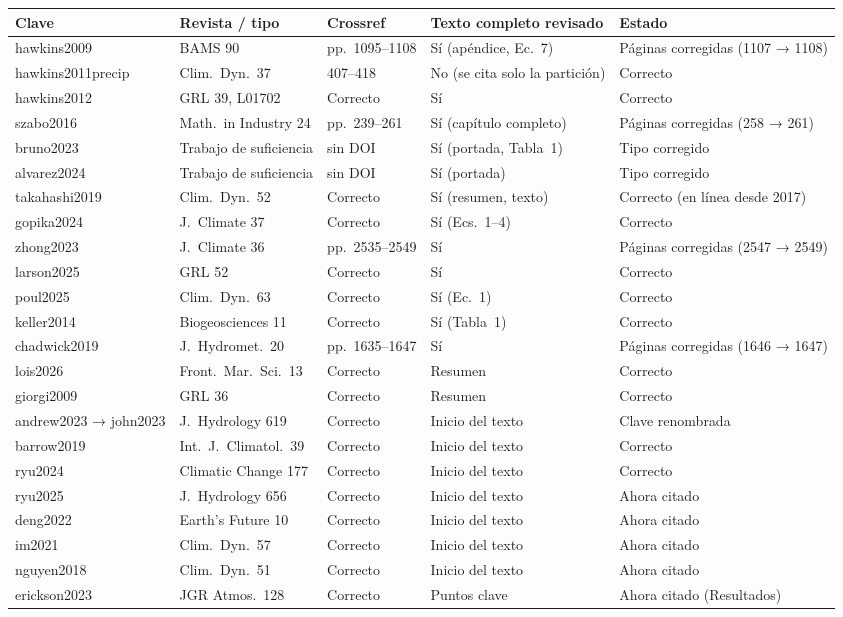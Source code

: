 \begin{center}\scriptsize
\begin{longtable}{@{}L{2.3cm}L{2.6cm}L{2.4cm}L{\dimexpr\textwidth-9.6cm-8\tabcolsep\relax}L{2.3cm}@{}}
\toprule
Clave & Revista / tipo & Crossref & Texto completo revisado & Estado \\
\midrule\endhead
hawkins2009 & BAMS 90 & pp.~1095--1108 & Sí (apéndice, Ec.~7) & Páginas corregidas (1107 → 1108) \\
hawkins2011\allowbreak precip & Clim.~Dyn.~37 & 407--418 & No (se cita solo la partición) & Correcto \\
hawkins2012 & GRL 39, L01702 & Correcto & Sí & Correcto \\
szabo2016 & Math.~in Industry 24 & pp.~239--261 & Sí (capítulo completo) & Páginas corregidas (258 → 261) \\
bruno2023 & Trabajo de suficiencia & sin DOI & Sí (portada, Tabla~1) & Tipo corregido \\
alvarez2024 & Trabajo de suficiencia & sin DOI & Sí (portada) & Tipo corregido \\
takahashi2019 & Clim.~Dyn.~52 & Correcto & Sí (resumen, texto) & Correcto (en línea desde 2017) \\
gopika2024 & J.~Climate 37 & Correcto & Sí (Ecs.~1--4) & Correcto \\
zhong2023 & J.~Climate 36 & pp.~2535--2549 & Sí & Páginas corregidas (2547 → 2549) \\
larson2025 & GRL 52 & Correcto & Sí & Correcto \\
poul2025 & Clim.~Dyn.~63 & Correcto & Sí (Ec.~1) & Correcto \\
keller2014 & Biogeosciences 11 & Correcto & Sí (Tabla~1) & Correcto \\
chadwick2019 & J.~Hydromet.~20 & pp.~1635--1647 & Sí & Páginas corregidas (1646 → 1647) \\
lois2026 & Front.~Mar.~Sci.~13 & Correcto & Resumen & Correcto \\
giorgi2009 & GRL 36 & Correcto & Resumen & Correcto \\
andrew2023 → john2023 & J.~Hydrology 619 & Correcto & Inicio del texto & Clave renombrada \\
barrow2019 & Int.~J.~Climatol.~39 & Correcto & Inicio del texto & Correcto \\
ryu2024 & Climatic Change 177 & Correcto & Inicio del texto & Correcto \\
ryu2025 & J.~Hydrology 656 & Correcto & Inicio del texto & Ahora citado \\
deng2022 & Earth's Future 10 & Correcto & Inicio del texto & Ahora citado \\
im2021 & Clim.~Dyn.~57 & Correcto & Inicio del texto & Ahora citado \\
nguyen2018 & Clim.~Dyn.~51 & Correcto & Inicio del texto & Ahora citado \\
erickson2023 & JGR Atmos.~128 & Correcto & Puntos clave & Ahora citado (Resultados) \\
\bottomrule
\end{longtable}
\end{center}

